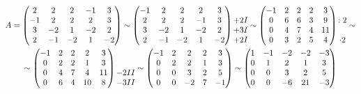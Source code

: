 \begin{multline*}
    A =
    \begin{pmatrix}
        2 & 2 & 2 & -1 & 3 \\
        -1 & 2 & 2 & 2 & 3 \\
        3 & -2 & 1 & -2 & 2 \\
        2 & -1 & -2 & 1 & -2
    \end{pmatrix} \sim
    \begin{pmatrix}
        -1 & 2 & 2 & 2 & 3 \\
        2 & 2 & 2 & -1 & 3 \\
        3 & -2 & 1 & -2 & 2 \\
        2 & -1 & -2 & 1 & -2
    \end{pmatrix}
    \begin{matrix}
        \ \\
        +2\rom1 \\
        +3\rom1 \\
        +2\rom1
    \end{matrix} \sim
    \begin{pmatrix}
        -1 & 2 & 2 & 2 & 3 \\
        0 & 6 & 6 & 3 & 9 \\
        0 & 4 & 7 & 4 & 11 \\
        0 & 3 & 2 & 5 & 4
    \end{pmatrix}
    \begin{matrix}
    	\ \\
        : 2 \\
        \ \\
        \cdot 2
    \end{matrix} \sim \\
    \sim
    \begin{pmatrix}
        -1 & 2 & 2 & 2 & 3 \\
        0 & 2 & 2 & 1 & 3 \\
        0 & 4 & 7 & 4 & 11 \\
        0 & 6 & 4 & 10 & 8
    \end{pmatrix}
    \begin{matrix}
    	\ \\
        \ \\
        -2\rom2 \\
        -3\rom2
    \end{matrix} \sim
    \begin{pmatrix}
    	-1 & 2 & 2 & 2 & 3 \\
        0 & 2 & 2 & 1 & 3 \\
        0 & 0 & 3 & 2 & 5 \\
        0 & 0 & -2 & 7 & -1
    \end{pmatrix} \sim
    \begin{pmatrix}
    	1 & -1 & -2 & -2 & -3 \\
        0 & 1 & 2 & 1 & 3 \\
        0 & 0 & 3 & 2 & 5 \\
        0 & 0 & -6 & 21 & -3
    \end{pmatrix}
\end{multline*}

